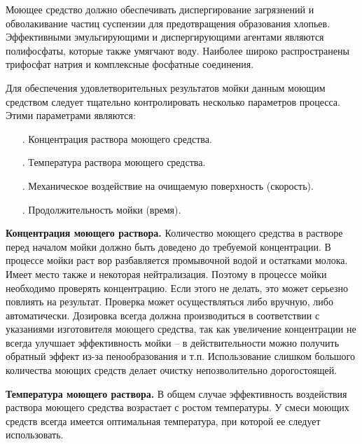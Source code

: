 {\par \redline Моющее средство должно обеспечивать диспергирование загрязнений и обволакивание частиц суспензии для предотвращения образования хлопьев. Эффективными эмульгирующими и диспергирующими агентами являются полифосфаты, которые также умягчают воду. Наиболее широко распространены трифосфат натрия и комплексные фосфатные соединения.

\par \redline Для обеспечения удовлетворительных результатов мойки данным моющим средством следует тщательно контролировать несколько параметров процесса. Этими параметрами являются:

\begin{itemize}[leftmargin=2.15cm, labelwidth=0.65cm, labelsep=0.0cm] 
	
	\item[\theitemcntr. ] Концентрация раствора моющего средства.
	\addtocounter{itemcntr}{1}
	
	\item[\theitemcntr. ] Температура раствора моющего средства.
	\addtocounter{itemcntr}{1}
	
	\item[\theitemcntr. ] Механическое воздействие на очищаемую поверхность (скорость).
	\addtocounter{itemcntr}{1}
	
	\item[\theitemcntr. ] Продолжительность мойки (время).
	\addtocounter{itemcntr}{1}
	
	\setcounter{itemcntr}{1}
\end{itemize}

\par \redline \textbf{Концентрация моющего раствора.} Количество моющего средства в растворе перед началом мойки должно быть доведено до требуемой концентрации. В процессе мойки раст вор разбавляется промывочной водой и остатками молока. Имеет место также и некоторая нейтрализация. Поэтому в процессе мойки необходимо проверять концентрацию. Если этого не делать, это может серьезно повлиять на результат. Проверка может осуществляться либо вручную, либо автоматически. Дозировка всегда должна производиться в соответствии с указаниями изготовителя моющего средства, так как увеличение концентрации не всегда улучшает эффективность мойки {--} в действительности можно получить обратный эффект из-за пенообразования и т.п. Использование слишком большого количества моющих средств делает очистку непозволительно дорогостоящей.

\par \redline \textbf{Температура моющего раствора.} В общем случае эффективность воздействия раствора моющего средства возрастает с ростом температуры. У смеси моющих средств всегда имеется оптимальная температура, при которой ее следует использовать.

}
